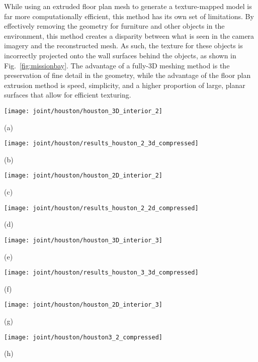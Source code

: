 \documentclass[10pt,twocolumn,twoside]{IEEEtran}
\begin{document}
While using an extruded floor plan mesh to generate a texture-mapped model is far more computationally efficient, this method has its own set of limitations.  By effectively removing the geometry for furniture and other objects in the environment, this method creates a disparity between what is seen in the camera imagery and the reconstructed mesh.  As such, the texture for these objects is incorrectly projected onto the wall surfaces behind the objects, as shown in Fig.~\ref{fig:missionbay}.  The advantage of a fully-3D meshing method is the preservation of fine detail in the geometry, while the advantage of the floor plan extrusion method is speed, simplicity, and a higher proportion of large, planar surfaces that allow for efficient texturing.

\begin{figure*}[t]

	\begin{minipage}[t]{0.48\linewidth}
		\centerline{\texttt{[image: joint/houston/houston\_3D\_interior\_2]}}
		\centerline{(a)}\medskip
	\end{minipage}
	\hfill
	\begin{minipage}[t]{0.48\linewidth}
		\centerline{\texttt{[image: joint/houston/results\_houston\_2\_3d\_compressed]}}
		\centerline{(b)}\medskip
	\end{minipage}
	\hfill
	\begin{minipage}[t]{0.48\linewidth}
		\centerline{\texttt{[image: joint/houston/houston\_2D\_interior\_2]}}
		\centerline{(c)}\medskip
	\end{minipage}
	\hfill
	\begin{minipage}[t]{0.48\linewidth}
		\centerline{\texttt{[image: joint/houston/results\_houston\_2\_2d\_compressed]}}
		\centerline{(d)}\medskip
	\end{minipage}
	
	\begin{minipage}[t]{0.48\linewidth}
		\centerline{\texttt{[image: joint/houston/houston\_3D\_interior\_3]}}
		\centerline{(e)}\medskip
	\end{minipage}
	\hfill
	\begin{minipage}[t]{0.48\linewidth}
		\centerline{\texttt{[image: joint/houston/results\_houston\_3\_3d\_compressed]}}
		\centerline{(f)}\medskip
	\end{minipage}
	\hfill
	\begin{minipage}[t]{0.48\linewidth}
		\centerline{\texttt{[image: joint/houston/houston\_2D\_interior\_3]}}
		\centerline{(g)}\medskip
	\end{minipage}
	\hfill
	\begin{minipage}[t]{0.48\linewidth}
		\centerline{\texttt{[image: joint/houston/houston3\_2\_compressed]}}
		\centerline{(h)}\medskip
	\end{minipage}


\end{figure*}
\end{document}
